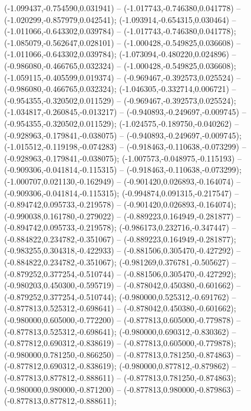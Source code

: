  (-1.099437,-0.754590,0.031941) -- (-1.017743,-0.746380,0.041778) -- (-1.020299,-0.857979,0.042541);
 (-1.093914,-0.654315,0.030464) -- (-1.011066,-0.643302,0.039784) -- (-1.017743,-0.746380,0.041778);
 (-1.085079,-0.562647,0.028101) -- (-1.000428,-0.549825,0.036608) -- (-1.011066,-0.643302,0.039784);
 (-1.073094,-0.480220,0.024896) -- (-0.986080,-0.466765,0.032324) -- (-1.000428,-0.549825,0.036608);
 (-1.059115,-0.405599,0.019374) -- (-0.969467,-0.392573,0.025524) -- (-0.986080,-0.466765,0.032324);
 (-1.046305,-0.332714,0.006721) -- (-0.954355,-0.320502,0.011529) -- (-0.969467,-0.392573,0.025524);
 (-1.034817,-0.260845,-0.013217) -- (-0.940893,-0.249697,-0.009745) -- (-0.954355,-0.320502,0.011529);
 (-1.024575,-0.189750,-0.040262) -- (-0.928963,-0.179841,-0.038075) -- (-0.940893,-0.249697,-0.009745);
 (-1.015512,-0.119198,-0.074283) -- (-0.918463,-0.110638,-0.073299) -- (-0.928963,-0.179841,-0.038075);
 (-1.007573,-0.048975,-0.115193) -- (-0.909306,-0.041814,-0.115315) -- (-0.918463,-0.110638,-0.073299);
 (-1.000707,0.021130,-0.162949) -- (-0.901420,0.026893,-0.164074) -- (-0.909306,-0.041814,-0.115315);
 (-0.994874,0.091315,-0.217547) -- (-0.894742,0.095733,-0.219578) -- (-0.901420,0.026893,-0.164074);
 (-0.990038,0.161780,-0.279022) -- (-0.889223,0.164949,-0.281877) -- (-0.894742,0.095733,-0.219578);
 (-0.986173,0.232716,-0.347447) -- (-0.884822,0.234782,-0.351067) -- (-0.889223,0.164949,-0.281877);
 (-0.983255,0.304318,-0.422933) -- (-0.881506,0.305470,-0.427292) -- (-0.884822,0.234782,-0.351067);
 (-0.981269,0.376781,-0.505627) -- (-0.879252,0.377254,-0.510744) -- (-0.881506,0.305470,-0.427292);
 (-0.980203,0.450300,-0.595719) -- (-0.878042,0.450380,-0.601662) -- (-0.879252,0.377254,-0.510744);
 (-0.980000,0.525312,-0.691762) -- (-0.877813,0.525312,-0.698641) -- (-0.878042,0.450380,-0.601662);
 (-0.980000,0.605000,-0.772200) -- (-0.877813,0.605000,-0.779878) -- (-0.877813,0.525312,-0.698641);
 (-0.980000,0.690312,-0.830362) -- (-0.877812,0.690312,-0.838619) -- (-0.877813,0.605000,-0.779878);
 (-0.980000,0.781250,-0.866250) -- (-0.877813,0.781250,-0.874863) -- (-0.877812,0.690312,-0.838619);
 (-0.980000,0.877812,-0.879862) -- (-0.877813,0.877812,-0.888611) -- (-0.877813,0.781250,-0.874863);
 (-0.980000,0.980000,-0.871200) -- (-0.877813,0.980000,-0.879863) -- (-0.877813,0.877812,-0.888611);
